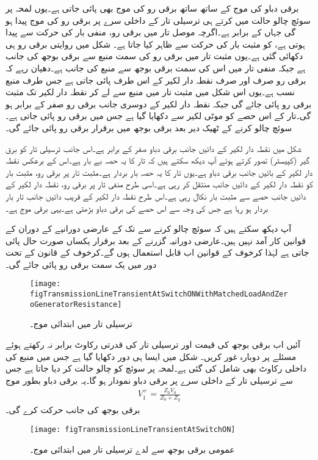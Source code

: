 برقی دباو کی موج کے ساتھ ساتھ برقی رو کی موج بھی پائی جاتی ہے۔یوں لمحہ  پر سوئچ چالو حالت میں کرتے ہی ترسیلی تار کے داخلی سرے پر  برقی رو کی موج پیدا ہو گی جہاں  کے برابر ہے۔اگرچہ موصل تار میں برقی رو، منفی بار کی حرکت سے پیدا ہوتی ہے،  کو مثبت بار کی حرکت سے ظاہر کیا جاتا ہے۔ شکل  میں روایتی برقی رو ہی دکھائی گئی ہے۔یوں مثبت تار میں برقی رو کی سمت منبع سے برقی بوجھ کی جانب ہے جبکہ منفی تار میں اس کی سمت برقی بوجھ سے منبع کی جانب ہے۔دھیان رہے کہ برقی رو صرف اور صرف نقطہ دار لکیر کے اس طرف پائی جاتی ہے جس طرف منبع نسب ہے۔یوں اس شکل میں مثبت تار میں منبع سے لے کر نقطہ دار لکیر تک مثبت برقی رو پائی جائے گی جبکہ نقطہ دار لکیر کے دوسری جانب برقی رو صفر کے برابر ہو گی۔تار کے اس حصے کو موٹی لکیر سے دکھایا گیا ہے جس میں برقی رو پائی جاتی ہے۔سوئچ چالو کرنے کے ٹھیک  دیر بعد برقی بوجھ میں برقرار  برقی رو  پائی جائے گی۔

شکل  میں نقطہ دار لکیر کے دائیں جانب برقی دباو صفر کے برابر ہے۔اس جانب ترسیلی تار کو برق گیر (کپیسٹر)  تصور کرتے ہوئے آپ دیکھ سکتے ہیں کہ تار کا یہ حصہ بے بار  ہے۔اس کے برعکس نقطہ دار لکیر کے بائیں جانب برقی دباو  ہے۔یوں تار کا یہ حصہ بار بردار ہے۔مثبت تار پر برقی رو، مثبت بار کو نقطہ دار لکیر کے دائیں جانب منتقل کر رہی ہے۔اسی طرح منفی تار پر برقی رو، نقطہ دار لکیر کے دائیں جانب حصے سے مثبت بار نکال رہی ہے۔اس طرح نقطہ دار لکیر کے قریب دائیں جانب تار بار بردار ہو رہا ہے جس کی وجہ سے اس حصے کی برقی دباو بڑھتی ہے۔یہی برقی موج ہے۔

آپ دیکھ سکتے ہیں کہ  سوئچ چالو کرنے سے  تک کے عارضی دورانیے کے دوران  کے قوانین کار آمد نہیں ہیں۔عارضی دورانیہ گزرنے کے بعد برقرار یکساں صورت حال پائی جاتی ہے لہٰذا کرخوف کے قوانین اب قابل استعمال ہوں گے۔کرخوف کے قانون کے تحت دور میں یک سمت برقی رو  پائی جائے گی۔
\begin{figure}
\centering
\texttt{[image: figTransmissionLineTransientAtSwitchONWithMatchedLoadAndZeroGeneratorResistance]}
\caption{ترسیلی تار میں ابتدائی موج۔}
\label{شکل_ترسیلی_ابتدائی_موج}
\end{figure}

آئیں اب برقی بوجھ کی قیمت اور ترسیلی تار کی قدرتی رکاوٹ برابر نہ رکھتے ہوئے مسئلے پر دوبارہ غور کریں۔ شکل  میں ایسا ہی دور دکھایا گیا ہے جس میں منبع کی داخلی رکاوٹ بھی شامل کی گئی ہے۔لمحہ  پر سوئچ کو چالو حالت کر دیا جاتا ہے جس سے ترسیلی تار کے داخلی سرے پر  برقی دباو نمودار ہو گا۔یہ برقی دباو بطور موج  
\begin{align}\label{مساوات_ترسیلی_عارضی_پہلی}
V_1^+=\frac{Z_0 V_0}{Z_0+Z_g}
\end{align}
برقی بوجھ کی جانب حرکت کرے گی۔
\begin{figure}
\centering
\texttt{[image: figTransmissionLineTransientAtSwitchON]}
\caption{عمومی برقی بوجھ سے لدے ترسیلی تار میں ابتدائی موج۔}
\label{شکل_ترسیلی_عمومی_بار_ابتدائی_موج}
\end{figure}

